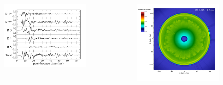 \documentclass[aspectratio=169]{beamer}
\begin{document}
\begin{frame}

  \begin{columns}[c]

      \begin{figure}
        \includegraphics[width=1.0\textwidth]{Figures/D9.6_strain_byRegions.pdf}
      \end{figure}

      \begin{figure}
        \includegraphics[width=1.0\textwidth]{Figures/D9.6_entropy_19.2ms.png}
      \end{figure}

  \end{columns}

\end{frame}
\end{document}

